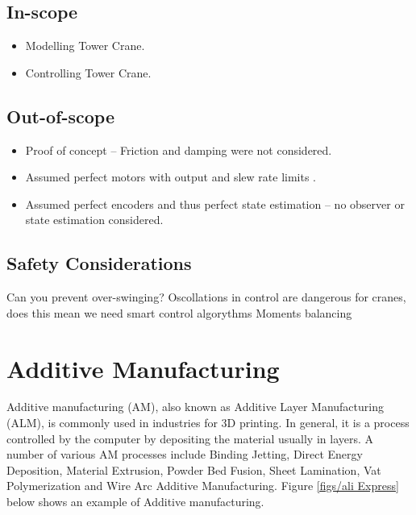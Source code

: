 \documentclass{UoNMCHA}
\numberwithin{equation}{section}
\begin{document}
	\newpage
	\subsection{In-scope} \label{In-scope}
	
	\begin{itemize}
		\item Modelling Tower Crane.
		\item Controlling Tower Crane.
	\end{itemize}
	
	\subsection{Out-of-scope} \label{Out-of-scope}
	
	\begin{itemize}
		\item Proof of concept – Friction and damping were not considered.
		\item Assumed perfect motors with output and slew rate limits .
		\item Assumed perfect encoders and thus perfect state estimation – no observer or state estimation considered.
		
	\end{itemize}
	
	
	\subsection{Safety Considerations} \label{Safety Considerations}
	
	Can you prevent over-swinging? Oscollations in control are dangerous for cranes, does this mean we need smart control algorythms
	Moments balancing 
	
	\newpage
	\section{Additive Manufacturing}\label{Additive Manufacturing}
	
	Additive manufacturing (AM), also known as Additive Layer Manufacturing (ALM), is commonly used in industries for 3D printing. In general, it is a process controlled by the computer by depositing the material usually in layers. A number of various AM processes include Binding Jetting, Direct Energy Deposition, Material Extrusion, Powder Bed Fusion, Sheet Lamination, Vat Polymerization and Wire Arc Additive Manufacturing. Figure \ref{figs/ali Express} below shows an example of Additive manufacturing.
	
\end{document}
